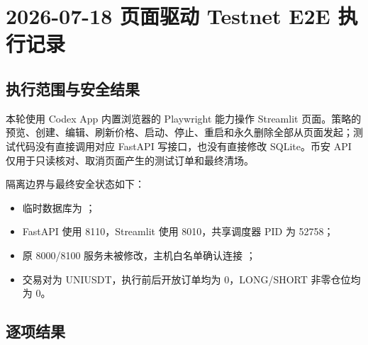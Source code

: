 \section{2026-07-18 页面驱动 Testnet E2E 执行记录}

\subsection{执行范围与安全结果}

本轮使用 Codex App 内置浏览器的 Playwright 能力操作 Streamlit 页面。策略的预览、创建、编辑、刷新价格、启动、停止、重启和永久删除全部从页面发起；测试代码没有直接调用对应 FastAPI 写接口，也没有直接修改 SQLite。币安 API 仅用于只读核对、取消页面产生的测试订单和最终清场。

隔离边界与最终安全状态如下：

\begin{itemize}
  \item 临时数据库为 ；
  \item FastAPI 使用 8110，Streamlit 使用 8010，共享调度器 PID 为 52758；
  \item 原 8000/8100 服务未被修改，主机白名单确认连接 ；
  \item 交易对为 UNIUSDT，执行前后开放订单均为 0，LONG/SHORT 非零仓位均为 0。
\end{itemize}

\subsection{逐项结果}

